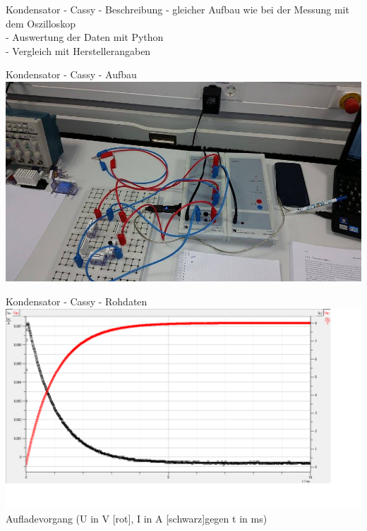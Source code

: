 \documentclass[11pt]{beamer}
\begin{document}


\begin{frame}{Kondensator - Cassy - Beschreibung}
- gleicher Aufbau wie bei der Messung mit dem Oszilloskop\\
- Auswertung der Daten mit Python\\
- Vergleich mit Herstellerangaben\\
\end{frame}

\begin{frame}{Kondensator - Cassy - Aufbau}
\includegraphics[scale=0.2]{12834837_1207198225971904_686312351_n.jpg}
\end{frame}

\begin{frame}{Kondensator - Cassy - Rohdaten}
\includegraphics[scale=0.2]{auf1.png}\\
Aufladevorgang (U in V [rot], I in A [schwarz]gegen t in ms)
\end{frame}
\end{document}
